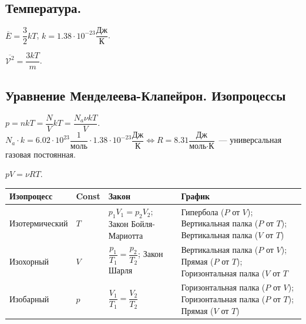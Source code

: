 \documentclass[12pt]{article}
\begin{document}
	\subsection{Температура.}
	\begin{definition}
		$\overline{E} = \dfrac{3}{2}kT$, $k = 1.38 \cdot 10^{-23} \dfrac{\text{Дж}}{\text{К}}$.
	\end{definition}
	\begin{definition}
		$\overline{\mathcal{V}^2} = \dfrac{3kT}{m}$.
	\end{definition}
	\subsection{Уравнение Менделеева-Клапейрон. Изопроцессы}
	$p = nkT = \dfrac{N}{V}kT = \dfrac{N_a \nu kT}{V}$. $N_a \cdot k = 6.02 \cdot 10^{23} \dfrac{1}{\text{моль}} \cdot 1.38 \cdot 10^{-23} \dfrac{\text{Дж}}{\text{К}} \Leftrightarrow R = 8.31 \dfrac{\text{Дж}}{\text{моль} \cdot \text{К}}$~--- универсальная газовая постоянная. \\
	\begin{definition}
		$pV = \nu RT$.
	\end{definition}
	\begin{xltabular}{\textwidth}{|X|X|X|X|}
		\hline
		Изопроцесс & Const & Закон & График \\
		\hline
		Изотермический & $T$ & $p_1V_1 = p_2V_2$; Закон Бойля-Мариотта & Гипербола ($P$ от $V$); Вертикальная палка ($P$ от $T$); Вертикальная палка ($V$ от $T$) \\
		\hline
		Изохорный & $V$ & $\dfrac{p_1}{T_1} = \dfrac{p_2}{T_2}$; Закон Шарля & Вертикальная палка ($P$ от $V$); Прямая ($P$ от $T$); Горизонтальная палка ($V$ от $T$ \\
		\hline
		Изобарный & $p$ & $\dfrac{V_1}{T_1} = \dfrac{V_2}{T_2}$ & Горизонтальная палка ($P$ от $V$); Горизонтальная палка ($P$ от $T$); Прямая ($V$ от $T$) \\
		\hline
	\end{xltabular}
\end{document}
